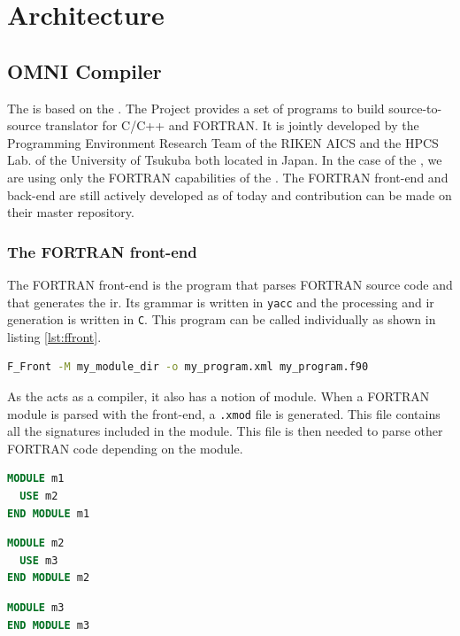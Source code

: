 \chapter{Architecture}
\section{OMNI Compiler}
The \clawfcomp is based on the \omni\cite{omni:website}. The \omni Project
provides a set of programs to build source-to-source translator for C/C++
and FORTRAN. It is jointly developed by the Programming Environment Research
Team of the RIKEN AICS and the HPCS Lab. of the University of Tsukuba both
located in Japan. In the case of the \clawfcomp, we are using only the FORTRAN
capabilities of the \omni. The FORTRAN front-end and back-end are still
actively developed as of today and contribution can be made on their master
repository\cite{omni:github}.

\subsection{The FORTRAN front-end}
The FORTRAN front-end is the program that parses FORTRAN source code and that
generates the \gls{ir}. Its grammar is written in \lstinline|yacc| and the
processing and \gls{ir} generation is written in \lstinline|C|. This program
can be called individually as shown in listing \ref{lst:ffront}.

\begin{lstlisting}[label=lst:ffront, language=Bash, caption=Call F\_Front]
F_Front -M my_module_dir -o my_program.xml my_program.f90
\end{lstlisting}

As the \omni acts as a compiler, it also has a notion of module. When a FORTRAN
module is parsed with the front-end, a \lstinline|.xmod| file is generated.
This file contains all the signatures included in the module. This file is then
needed to parse other FORTRAN code depending on the module.

\begin{lstlisting}[label=lst:m1, language=Fortran, caption=module\_m1.f90]
MODULE m1
  USE m2
END MODULE m1
\end{lstlisting}

\begin{lstlisting}[label=lst:m2, language=Fortran, caption=module\_m2.f90]
MODULE m2
  USE m3
END MODULE m2
\end{lstlisting}

\begin{lstlisting}[label=lst:m3, language=Fortran, caption=module\_m3.f90]
MODULE m3
END MODULE m3
\end{lstlisting}

